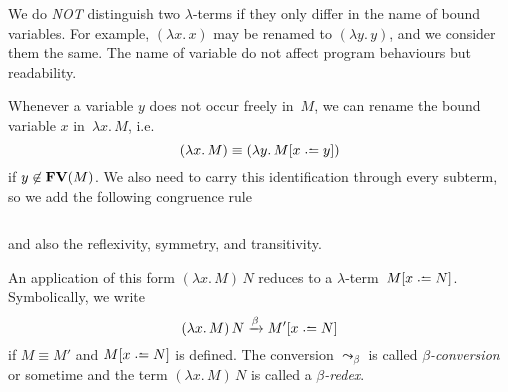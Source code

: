 \begin{convention}
  We do \emph{NOT} distinguish two $\lambda$-terms if they only differ in the
  name of bound variables. For example, $(\lambda x.\, x)$ may be renamed to 
  $(\lambda y.\, y)$, and we consider them the same. The name of variable do not
  affect program behaviours but readability.
\end{convention}
\begin{definition}
  Whenever a variable $y$ does not occur freely in~$M$, we can rename the bound
  variable $x$ in~$\lambda x.\, M$, i.e.\ 
  \[
    (\lambda x.\, M) \equiv (\lambda y.\, M\subst{x}{y})
  \]
  if $y \not\in \mathbf{FV}(M)$. We also need to carry this identification through every
  subterm, so we add the following congruence rule
  \begin{columns}
    \begin{prooftree}
    \end{prooftree}
    \begin{prooftree}
    \end{prooftree}
  \end{columns}
  and also the reflexivity, symmetry, and transitivity.
\end{definition}
\begin{definition}
  An application of this form $(\lambda x.\, M)\, N$ reduces to a
  $\lambda$-term~$M\subst{x}{N}$. Symbolically, we write 
  \[
    (\lambda x.\, M)\, N \xrightarrow{\beta} M'\subst{x}{N}
  \]
  if $M\equiv M'$ and $M\subst{x}{N}$ is defined.
  The conversion $\leadsto_\beta$ is called \emph{$\beta$-conversion} or
  sometime and the term $(\lambda x.\, M)\, N$ is
  called a \emph{$\beta$-redex}.
\end{definition}
